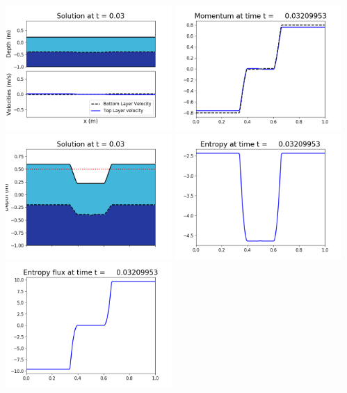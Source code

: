 \documentclass[11pt]{article}
\begin{document}
\includegraphics[width=0.475\textwidth]{frame0089fig1002.png}
\vskip 10pt 
\includegraphics[width=0.475\textwidth]{frame0089fig1003.png}
\includegraphics[width=0.475\textwidth]{frame0089fig1006.png}
\vskip 10pt 
\includegraphics[width=0.475\textwidth]{frame0089fig1007.png}
\includegraphics[width=0.475\textwidth]{frame0089fig1008.png}
\end{document}
